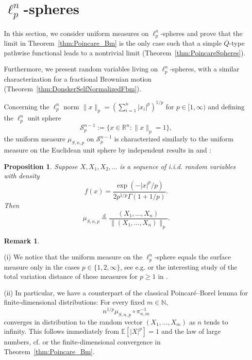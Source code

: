 \documentclass[numbers,compress,v1.0.1]{vmsta}
\newtheorem{proposition}[theorem]{Proposition}
\theoremstyle{definition}
\newtheorem{remark}[theorem]{Remark}
\def\N{\mathbb{N}}
\def\R{\mathbb{R}}
\def\ex{\mathbb{E}}
\begin{document}
\section{$\ell^n_p$-spheres}\label{section2}

In this section, we consider uniform measures on $\ell^n_p$-spheres and prove
that the limit in Theorem~\ref{thm:Poincare_Bm} is the only case
such that a simple $\overline{Q}$-type pathwise functional leads to a
nontrivial limit (Theorem~\ref{thm:PoincareSpheres}).

Furthermore, we present random variables living on $\ell^n_p$-spheres, with a
similar characterization for a fractional Brownian motion
(Theorem~\ref{thm:DonskerSelfNormalizedFbm}).

Concerning the $\ell^n_p$ norm $\|x\|_p =  (\sum_{i=1}^{n}|x_i|^p )^{1/p}$
for $p \in[1,\infty)$ and defining the $\ell^n_p$ unit sphere
%
\[
\mathcal{S}^{n-1}_p := \bigl\{x \in\R^n : \|x
\|_p=1\bigr\},
\]
%
the uniform measure $\mu_{S,n,p}$ on $\mathcal{S}^{n-1}_p$ is
characterized similarly to the uniform measure on the Euclidean unit
sphere by independent results in \cite[Lemma~1]{Schechtman} and \cite
[Lemma~3.1]{Rachev}:
%
\begin{proposition}\label{prop:uniformEllPSphere}
Suppose $X,X_1, X_2,\ldots$ is a sequence of i.i.d. random variables
with density
%
\[
f(x) = \frac{\exp(-|x|^p/p)}{2p^{1/p}\varGamma(1+1/p)}.
\]
%
Then
%
\[
\mu_{S,n,p} \stackrel{d} {=} %
\frac{(X_1,\ldots, X_n)}{\|(X_1,\ldots, X_n)\|_p}.
\]
%
\end{proposition}

\begin{remark}\label{remark:PoincareEllp}

(i) We notice that the uniform measure on the $\ell^n_p$-sphere
equals the surface measure only in the cases $p \in\{1,2,\infty\}$,
see e.g. \cite[Section~3]{Rachev} or the interesting study of the total
variation distance of these measures for $p \geq1$ in \cite{Naor}.

(ii) In particular, we have a counterpart of the classical Poincar\'
{e}--Borel lemma for finite-dimensional distributions: For every fixed
$m \in\N$,
%
\[
n^{1/p}\mu_{S,n,p} \circ\pi_{n,m}^{-1}
\]
%
converges in distribution to the random vector $(X_1,\ldots, X_m)$ as $n$
tends to infinity. This follows immediately from $\ex[|X|^p]=1$ and the law
of large numbers, cf. \cite[Proposition~6.1]{Lifshits} or the
finite-dimensional convergence in Theorem~\ref{thm:Poincare_Bm}.
\end{remark}
\end{document}
